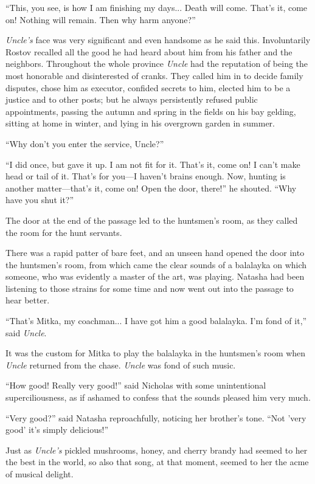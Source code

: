 ``This, you see, is how I am finishing my days... Death will
come. That's it, come on! Nothing will remain. Then why harm
anyone?''

\emph{Uncle's} face was very significant and even handsome as he
said this.  Involuntarily Rostov recalled all the good he had
heard about him from his father and the neighbors. Throughout the
whole province \emph{Uncle} had the reputation of being the most
honorable and disinterested of cranks.  They called him in to
decide family disputes, chose him as executor, confided secrets
to him, elected him to be a justice and to other posts; but he
always persistently refused public appointments, passing the
autumn and spring in the fields on his bay gelding, sitting at
home in winter, and lying in his overgrown garden in summer.

``Why don't you enter the service, Uncle?''

``I did once, but gave it up. I am not fit for it. That's it,
come on! I can't make head or tail of it. That's for you---I
haven't brains enough.  Now, hunting is another matter---that's
it, come on! Open the door, there!'' he shouted. ``Why have you
shut it?''

The door at the end of the passage led to the huntsmen's room, as
they called the room for the hunt servants.

There was a rapid patter of bare feet, and an unseen hand opened
the door into the huntsmen's room, from which came the clear
sounds of a balalayka on which someone, who was evidently a
master of the art, was playing. Natasha had been listening to
those strains for some time and now went out into the passage to
hear better.

``That's Mitka, my coachman... I have got him a good
balalayka. I'm fond of it,'' said \emph{Uncle}.

It was the custom for Mitka to play the balalayka in the
huntsmen's room when \emph{Uncle} returned from the
chase. \emph{Uncle} was fond of such music.

``How good! Really very good!'' said Nicholas with some
unintentional superciliousness, as if ashamed to confess that the
sounds pleased him very much.

``Very good?'' said Natasha reproachfully, noticing her brother's
tone.  ``Not 'very good' it's simply delicious!''

Just as \emph{Uncle's} pickled mushrooms, honey, and cherry
brandy had seemed to her the best in the world, so also that
song, at that moment, seemed to her the acme of musical delight.

